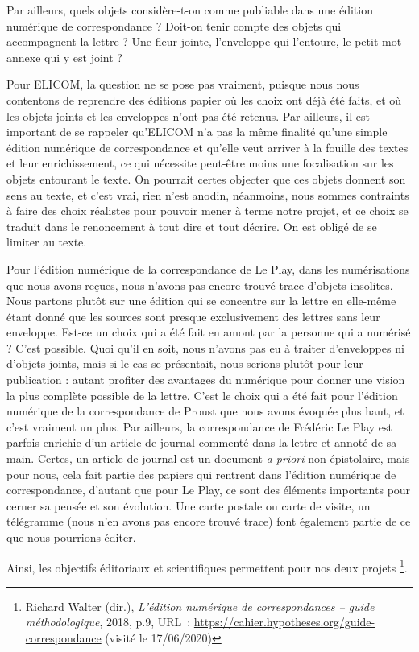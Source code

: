Par ailleurs, quels objets considère-t-on comme publiable dans une édition numérique de correspondance ? Doit-on tenir compte des objets qui accompagnent la lettre ? Une fleur jointe, l'enveloppe qui l'entoure, le petit mot annexe qui y est joint ?

Pour ELICOM, la question ne se pose pas vraiment, puisque nous nous contentons de reprendre des éditions papier où les choix ont déjà été faits, et où les objets joints et les enveloppes n'ont pas été retenus. Par ailleurs, il est important de se rappeler qu'ELICOM n'a pas la même finalité qu'une simple édition numérique de correspondance et qu'elle veut arriver à la fouille des textes et leur enrichissement, ce qui nécessite peut-être moins une focalisation sur les objets entourant le texte. On pourrait certes objecter que ces objets donnent son sens au texte, et c'est vrai, rien n'est anodin, néanmoins, nous sommes contraints à faire des choix réalistes pour pouvoir mener à terme notre projet, et ce choix se traduit dans le renoncement à tout dire et tout décrire. On est obligé de se limiter au texte.

Pour l'édition numérique de la correspondance de Le Play, dans les numérisations que nous avons reçues, nous n'avons pas encore trouvé trace d'objets insolites. Nous partons plutôt sur une édition qui se concentre sur la lettre en elle-même étant donné que les sources sont presque exclusivement des lettres sans leur enveloppe. Est-ce un choix qui a été fait en amont par la personne qui a numérisé ? C'est possible. Quoi qu'il en soit, nous n'avons pas eu à traiter d'enveloppes ni d'objets joints, mais si le cas se présentait, nous serions plutôt pour leur publication : autant profiter des avantages du numérique pour donner une vision la plus complète possible de la lettre. C'est le choix qui a été fait pour l'édition numérique de la correspondance de Proust que nous avons évoquée plus haut, et c'est vraiment un plus. Par ailleurs, la correspondance de Frédéric Le Play est parfois enrichie d'un article de journal commenté dans la lettre et annoté de sa main. Certes, un article de journal est un document \emph{a priori} non épistolaire, mais pour nous, cela fait partie des papiers qui rentrent dans l'édition numérique de correspondance, d'autant que pour Le Play, ce sont des éléments importants pour cerner sa pensée et son évolution. Une carte postale ou carte de visite, un télégramme (nous n'en avons pas encore trouvé trace) font également partie de ce que nous pourrions éditer.

Ainsi, les objectifs éditoriaux et scientifiques permettent pour nos deux projets \footnote{ Richard Walter (dir.), \emph{L’édition numérique de correspondances – guide méthodologique}, 2018, p.9, URL :  \url{https://cahier.hypotheses.org/guide-correspondance} (visité le 17/06/2020)}.\\

